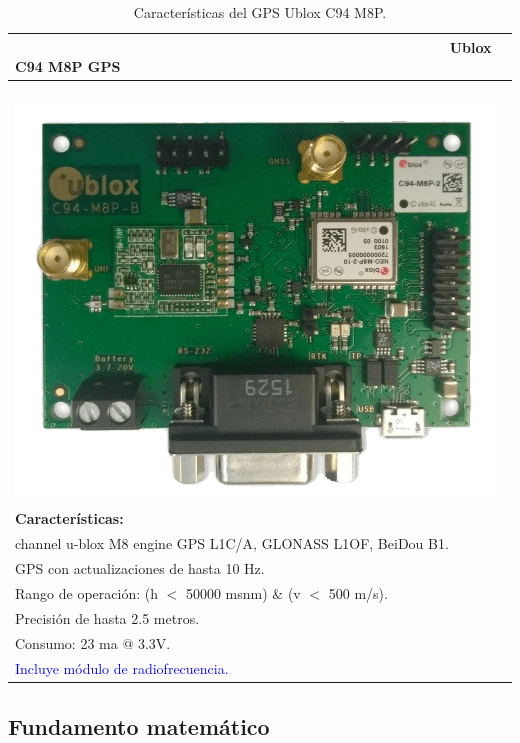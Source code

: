 \begin{table}[!htb]
\begin{center}
\caption{Características del GPS Ublox C94 M8P.}
\begin{tabular}{|l|}
	\hline
	\ \ \ \ \ \ \ \ \ \ \ \ \ \ \ \ \ \ \ \ \ \ \ \ \ \ \ \ \ \ \ \ \ \ \ \ \ \ \ \ \ \ \ \ \ \ \ \ \ \ \ \ \ \ \textbf{Ublox C94 M8P GPS}\\
	\hline
	      \ \ \ \ \ \ \ \ \ \ \ \ \ \ \ \ \ \ \ \ \ \ \ \ \ \ \ \ \ \ \ \ \ \ \ \ \ \ \ \ \includegraphics[width=0.25\linewidth]{Figures/ublox}\footnotemark
	\label{fig:ubx} \\
	\textbf{Características: }\\

		\tabitem 72 channel u-blox M8 engine GPS L1C/A, GLONASS L1OF, BeiDou B1.\\
		\tabitem GPS con actualizaciones de hasta 10 Hz.\\
		\tabitem Rango de operación: (h $<$ 50000 msnm) \& (v $<$ 500 m/s).\\
		\tabitem Precisión de hasta 2.5 metros.\\
		\tabitem Consumo: 23 ma @ 3.3V.\\
		\tabitem \textcolor{blue}{Incluye módulo de radiofrecuencia.}\\
	\hline
\end{tabular}
\end{center}
\end{table}


\FloatBarrier

\newpage

\subsection{Fundamento matemático}

